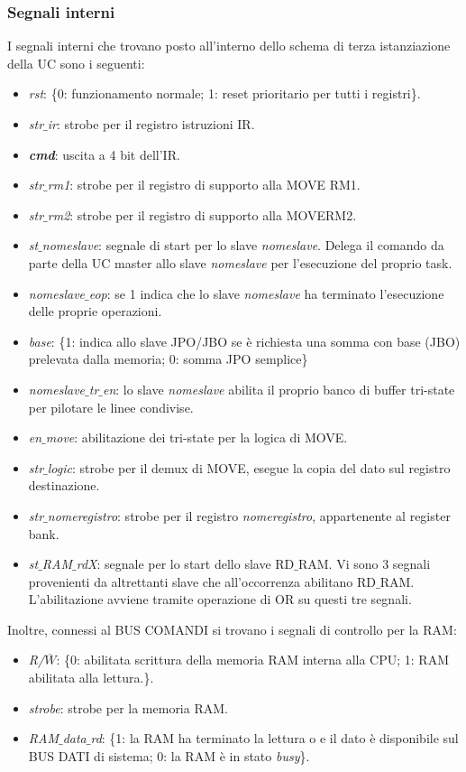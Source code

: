 \subsubsection{Segnali interni}
I segnali interni che trovano posto all'interno dello schema di terza istanziazione della UC sono i seguenti:
\begin{itemize}
	\item \textit{rst}: \{0: funzionamento normale; 1: reset prioritario per tutti i registri\}.
	\item \textit{str$\_$ir}: strobe per il registro istruzioni IR.
	\item \textit{\textbf{cmd}}: uscita a 4 bit dell'IR.
	\item \textit{str$\_$rm1}: strobe per il registro di supporto alla MOVE RM1.
	\item \textit{str$\_$rm2}: strobe per il registro di supporto alla MOVERM2.
	\item \textit{st$\_$nomeslave}: segnale di start per lo slave \textit{nomeslave}. Delega il comando da parte della UC master allo slave \textit{nomeslave} per l'esecuzione del proprio task.
	\item \textit{nomeslave$\_$eop}: se 1 indica che lo slave \textit{nomeslave} ha terminato l'esecuzione delle proprie operazioni.
	\item \textit{base}: \{1: indica allo slave JPO/JBO se è richiesta una somma con base (JBO) prelevata dalla memoria; 0: somma JPO semplice\}\item \textit{nomeslave$\_$tr$\_$en}: lo slave \textit{nomeslave} abilita il proprio banco di buffer tri-state per pilotare le linee condivise.
	\item \textit{en$\_$move}: abilitazione dei tri-state per la logica di MOVE.
	\item \textit{str$\_$logic}: strobe per il demux di MOVE, esegue la copia del dato sul registro destinazione.
	\item \textit{str$\_$nomeregistro}: strobe per il registro \textit{nomeregistro}, appartenente al register bank.
	\item \textit{st$\_$RAM$\_$rdX}: segnale per lo start dello slave RD$\_$RAM. Vi sono 3 segnali provenienti da altrettanti slave che all'occorrenza abilitano RD$\_$RAM. L'abilitazione avviene tramite operazione di OR su questi tre segnali.
\end{itemize}
Inoltre, connessi al BUS COMANDI si trovano i segnali di controllo per la RAM:
\begin{itemize}
	\item \textit{R/$\overline{W}$}: \{0: abilitata scrittura della memoria RAM interna alla CPU; 1: RAM abilitata alla lettura.\}.
	\item \textit{strobe}: strobe per la memoria RAM.
	\item \textit{RAM$\_$data$\_$rd}: \{1: la RAM ha terminato la lettura o e il dato è disponibile sul BUS DATI di sistema; 0: la RAM è in stato \textit{busy}\}.
\end{itemize}

